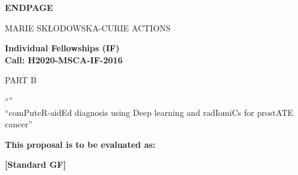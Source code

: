 \newpage
\vspace{15mm}
\begin{center}


        \Large{


        \textbf{ENDPAGE}

          \vspace{15mm}
          MARIE SK\L{}ODOWSKA-CURIE ACTIONS\\
          \vspace{1cm}

          \textbf{Individual Fellowships (IF)}\\
          \textbf{Call: H2020-MSCA-IF-2016}
          \vspace{2cm}

          PART B
          \vspace{2.5cm}

          ``\proposalAcronym''\\
          \vspace{1cm}
          ``comPuteR-aidEd diagnosis using Deep learning and radIomiCs for prostATE cancer''
          \vspace{1cm}

          \textbf{This proposal is to be evaluated as:}
          \vspace{.5cm}

          \textbf{[Standard GF]}
        }

  \end{center}
\vspace{1cm}
